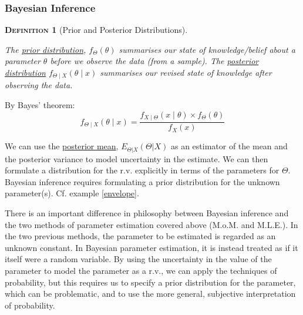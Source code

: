 \documentclass[12pt,a4paper]{article}
\newtheorem{definition}{\textsc{Definition}}[section]
\begin{document}
\subsubsection{Bayesian Inference}

\begin{definition}[Prior and Posterior Distributions]$\;$\par\vspace{1cm}

The \underline{prior distribution}, $f_\Theta(\theta)$ summarises our state of knowledge/belief about a parameter $\theta$ before we observe the data (from a sample). The \underline{posterior distribution} $f_{\Theta \mid X}(\theta \mid x)$ summarises our revised state of knowledge after observing the data.

\end{definition}

By Bayes' theorem:
$$f_{\Theta \mid X}(\theta\mid x) = \frac{f_{X\mid\Theta}(x\mid \theta) \times f_{\Theta}(\theta)}{f_X(x)}$$

We can use the \underline{posterior mean}, $E_{\Theta|X}(\Theta | X)$ as an estimator of the mean and the posterior variance to model uncertainty in the estimate. We can then formulate a distribution for the r.v. explicitly in terms of the parameters for $\Theta$. Bayesian inference requires formulating a prior distribution for the unknown parameter(s). Cf. example \ref{envelope}.

There is an important difference in philosophy between Bayesian inference and the two methods of parameter estimation covered above (M.o.M. and M.L.E.). In the two previous methods, the parameter to be estimated is regarded as an unknown constant. In Bayesian parameter estimation, it is instead treated as if it itself were a random variable. By using the uncertainty in the value of the parameter to model the parameter as a r.v., we can apply the techniques of probability, but this requires us to specify a prior distribution for the parameter, which can be problematic, and to use the more general, subjective interpretation of probability.
\end{document}
